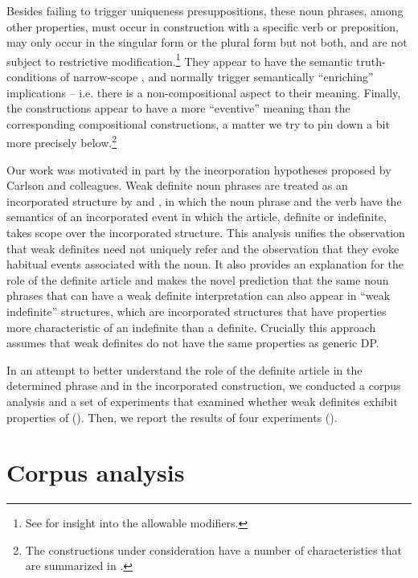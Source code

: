 \documentclass[output=paper,
modfonts
]{langscibook}
\begin{document}
Besides failing to trigger uniqueness presuppositions, these noun phrases\linebreak, among other properties, must occur in construction with a specific verb or preposition, may only occur in the singular form or the plural form but not both, and are not subject to restrictive modification.\footnote{See \citet{Aguilar-Guevara2014} for insight into the allowable modifiers.} They appear to have the semantic truth-conditions of narrow-scope , and normally trigger semantically “enriching” implications -- i.e. there is a non-compositional aspect to their meaning. Finally, the constructions appear to have a more “eventive” meaning than the corresponding compositional constructions, a matter we try to pin down a bit more precisely below.\footnote{ The constructions under consideration have a number of characteristics that are summarized in \citet{CarlsonEtAlii2006}.}

Our work was motivated in part by the incorporation hypotheses proposed by Carlson and colleagues. Weak definite noun phrases are treated as an incorporated structure by \citet{CarlsonEtAlii2013} and \citet{KleinEtAlii2013}, in which the noun phrase and the verb have the semantics of an incorporated event in which the article, definite or indefinite, takes scope over the incorporated structure. This analysis unifies the observation that weak definites need not uniquely refer and the observation that they evoke habitual events associated with the noun. It also provides an explanation for the role of the definite article and makes the novel prediction that the same noun phrases that can have a weak definite interpretation can also appear in “weak indefinite” structures, which are incorporated structures that have properties more characteristic of an indefinite than a definite. Crucially this approach assumes that weak definites do not have the same properties as generic DP.

In an attempt to better understand the role of the definite article in the determined phrase and in the incorporated construction, we conducted a corpus analysis and a set of experiments that examined whether weak definites exhibit properties of  (). Then, we report the results of four experiments ().

\section{Corpus analysis} \label{seC:desaetal:3}
\end{document}
